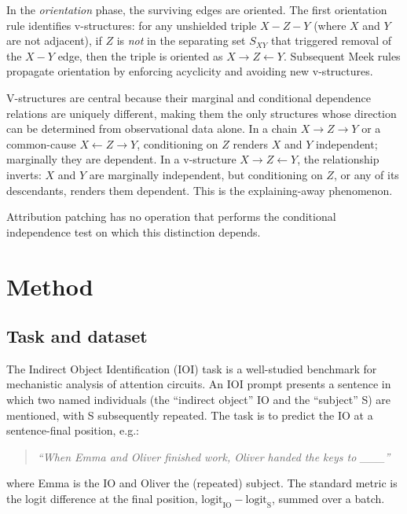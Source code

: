 \documentclass[conference]{IEEEtran}
\begin{document}
In the \emph{orientation} phase, the surviving edges are oriented. The first orientation rule identifies v-structures: for any unshielded triple $X - Z - Y$ (where $X$ and $Y$ are not adjacent), if $Z$ is \emph{not} in the separating set $S_{XY}$ that triggered removal of the $X - Y$ edge, then the triple is oriented as $X \to Z \leftarrow Y$. Subsequent Meek rules propagate orientation by enforcing acyclicity and avoiding new v-structures.

V-structures are central because their marginal and conditional dependence relations are uniquely different, making them the only structures whose direction can be determined from observational data alone. In a chain $X \to Z \to Y$ or a common-cause $X \leftarrow Z \to Y$, conditioning on $Z$ renders $X$ and $Y$ independent; marginally they are dependent. In a v-structure $X \to Z \leftarrow Y$, the relationship inverts: $X$ and $Y$ are marginally independent, but conditioning on $Z$, or any of its descendants, renders them dependent. This is the explaining-away phenomenon.

Attribution patching has no operation that performs the conditional independence test on which this distinction depends.

\section{Method}\label{sec:method}

\subsection{Task and dataset}
The Indirect Object Identification (IOI) task \cite{wang2022} is a well-studied benchmark for mechanistic analysis of attention circuits. An IOI prompt presents a sentence in which two named individuals (the ``indirect object'' IO and the ``subject'' S) are mentioned, with S subsequently repeated. The task is to predict the IO at a sentence-final position, e.g.:
\begin{quote}
\textit{``When Emma and Oliver finished work, Oliver handed the keys to \_\_\_''}
\end{quote}
where Emma is the IO and Oliver the (repeated) subject. The standard metric is the logit difference at the final position, $\text{logit}_{\text{IO}} - \text{logit}_{\text{S}}$, summed over a batch.
\end{document}
